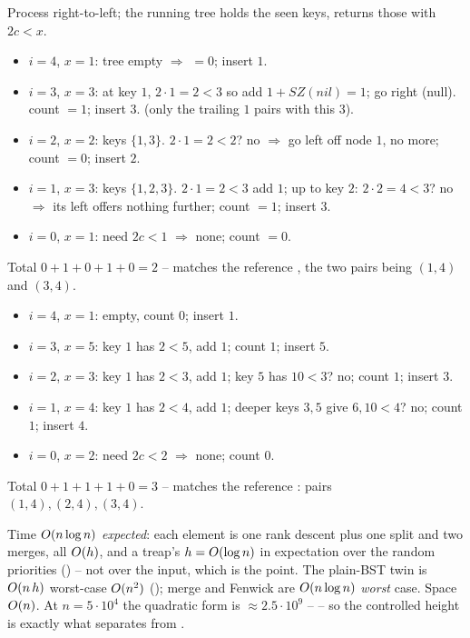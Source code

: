 \begin{tracebox}
Process right-to-left; the running tree holds the seen keys,  returns those with $2c<x$.
\begin{itemize}[nosep,leftmargin=1.3em]
  \item $i=4$, $x=1$: tree empty $\Rightarrow$ $=0$; insert $1$. \checkmark
  \item $i=3$, $x=3$: at key $1$, $2\cdot1=2<3$ so add $1+\mathit{SZ}(nil)=1$; go right (null). count $=1$;
        insert $3$. \checkmark (only the trailing $1$ pairs with this $3$).
  \item $i=2$, $x=2$: keys $\{1,3\}$. $2\cdot1=2<2$? no $\Rightarrow$ go left off node $1$, no more; count
        $=0$; insert $2$. \checkmark
  \item $i=1$, $x=3$: keys $\{1,2,3\}$. $2\cdot1=2<3$ add $1$; up to key $2$: $2\cdot2=4<3$? no $\Rightarrow$
        its left offers nothing further; count $=1$; insert $3$. \checkmark
  \item $i=0$, $x=1$: need $2c<1$ $\Rightarrow$ none; count $=0$. \checkmark
\end{itemize}
Total $0+1+0+1+0=2$ -- matches the reference \checkmark, the two pairs being $(1,4)$ and $(3,4)$.
\end{tracebox}
\begin{tracebox}
\begin{itemize}[nosep,leftmargin=1.3em]
  \item $i=4$, $x=1$: empty, count $0$; insert $1$.
  \item $i=3$, $x=5$: key $1$ has $2<5$, add $1$; count $1$; insert $5$.
  \item $i=2$, $x=3$: key $1$ has $2<3$, add $1$; key $5$ has $10<3$? no; count $1$; insert $3$.
  \item $i=1$, $x=4$: key $1$ has $2<4$, add $1$; deeper keys $3,5$ give $6,10<4$? no; count $1$; insert $4$.
  \item $i=0$, $x=2$: need $2c<2$ $\Rightarrow$ none; count $0$.
\end{itemize}
Total $0+1+1+1+0=3$ -- matches the reference \checkmark: pairs $(1,4),(2,4),(3,4)$.
\end{tracebox}

\begin{complexitybox}
Time $O(n\log n)$ \emph{expected}: each element is one rank descent plus one split and two merges, all
$O(h)$, and a treap's $h=O(\log n)$ in expectation over the random priorities
() -- not over the input, which is the point. The plain-BST twin is
$O(n\,h)$ worst-case $O(n^2)$ (); merge and Fenwick are
$O(n\log n)$ \emph{worst} case. Space $O(n)$. At $n=5\cdot10^{4}$ the quadratic form is
$\approx2.5\cdot10^{9}$ -- \tle -- so the controlled height is exactly what separates \ac{} from \tle.
\end{complexitybox}

